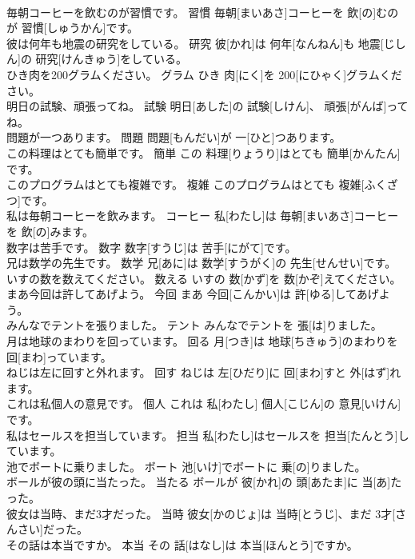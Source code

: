 \documentclass[8pt]{extreport}
\begin{document}
\begin{CJK}{UTF8}{min}
\\	毎朝コーヒーを飲むのが習慣です。	習慣	毎朝[まいあさ]コーヒーを 飲[の]むのが 習慣[しゅうかん]です。	
\\	彼は何年も地震の研究をしている。	研究	彼[かれ]は 何年[なんねん]も 地震[じしん]の 研究[けんきゅう]をしている。	
\\	ひき肉を200グラムください。	グラム	ひき 肉[にく]を 200[にひゃく]グラムください。	
\\	明日の試験、頑張ってね。	試験	明日[あした]の 試験[しけん]、 頑張[がんば]ってね。	
\\	問題が一つあります。	問題	問題[もんだい]が 一[ひと]つあります。	
\\	この料理はとても簡単です。	簡単	この 料理[りょうり]はとても 簡単[かんたん]です。	
\\	このプログラムはとても複雑です。	複雑	このプログラムはとても 複雑[ふくざつ]です。	
\\	私は毎朝コーヒーを飲みます。	コーヒー	私[わたし]は 毎朝[まいあさ]コーヒーを 飲[の]みます。	
\\	数字は苦手です。	数字	数字[すうじ]は 苦手[にがて]です。	
\\	兄は数学の先生です。	数学	兄[あに]は 数学[すうがく]の 先生[せんせい]です。	
\\	いすの数を数えてください。	数える	いすの 数[かず]を 数[かぞ]えてください。	
\\	まあ今回は許してあげよう。	今回	まあ 今回[こんかい]は 許[ゆる]してあげよう。	
\\	みんなでテントを張りました。	テント	みんなでテントを 張[は]りました。	
\\	月は地球のまわりを回っています。	回る	月[つき]は 地球[ちきゅう]のまわりを 回[まわ]っています。	
\\	ねじは左に回すと外れます。	回す	ねじは 左[ひだり]に 回[まわ]すと 外[はず]れます。	
\\	これは私個人の意見です。	個人	これは 私[わたし] 個人[こじん]の 意見[いけん]です。	
\\	私はセールスを担当しています。	担当	私[わたし]はセールスを 担当[たんとう]しています。	
\\	池でボートに乗りました。	ボート	池[いけ]でボートに 乗[の]りました。	
\\	ボールが彼の頭に当たった。	当たる	ボールが 彼[かれ]の 頭[あたま]に 当[あ]たった。	
\\	彼女は当時、まだ3才だった。	当時	彼女[かのじょ]は 当時[とうじ]、まだ 3才[さんさい]だった。	
\\	その話は本当ですか。	本当	その 話[はなし]は 本当[ほんとう]ですか。	

\end{CJK}
\end{document}
